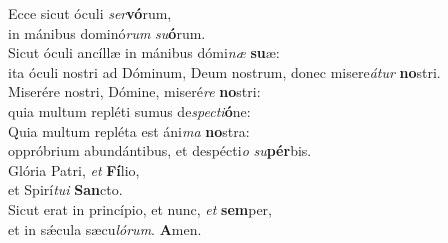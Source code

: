 \evenverse Ecce sicut óculi \textit{ser}\textbf{vó}rum,~\*\\
\evenverse in mánibus dominó\textit{rum} \textit{su}\textbf{ó}rum.\\
\oddverse Sicut óculi ancíllæ in mánibus dómi\textit{næ} \textbf{su}æ:~\*\\
\oddverse ita óculi nostri ad Dóminum, Deum nostrum, donec misere\textit{á}\textit{tur} \textbf{no}stri.\\
\evenverse Miserére nostri, Dómine, miseré\textit{re} \textbf{no}stri:~\*\\
\evenverse quia multum repléti sumus de\textit{spe}\textit{cti}\textbf{ó}ne:\\
\oddverse Quia multum repléta est áni\textit{ma} \textbf{no}stra:~\*\\
\oddverse oppróbrium abundántibus, et despécti\textit{o} \textit{su}\textbf{pér}bis.\\
\evenverse Glória Patri, \textit{et} \textbf{Fí}lio,~\*\\
\evenverse et Spirí\textit{tu}\textit{i} \textbf{San}cto.\\
\oddverse Sicut erat in princípio, et nunc, \textit{et} \textbf{sem}per,~\*\\
\oddverse et in sǽcula sæcu\textit{ló}\textit{rum}. \textbf{A}men.\\
